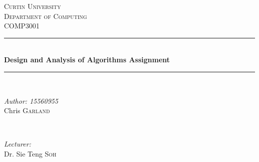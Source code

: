 \begin{titlepage}

\newcommand{\HRule}{\rule{\linewidth}{0.5mm}} 


\center %
 
\textsc{\LARGE Curtin University}\\[1.5cm] %
\textsc{\Large Department of Computing}\\[0.5cm] %
\textsc{\large COMP3001}\\[0.5cm] %


\HRule \\[0.4cm]
{ \huge \bfseries Design and Analysis of Algorithms Assignment}\\[0.4cm] %
\HRule \\[1.5cm]
 

\begin{minipage}{0.4\textwidth}
\begin{flushleft} \large
\emph{Author: 15560955}\\
Chris \textsc{Garland} %
\end{flushleft}
\end{minipage}
~
\begin{minipage}{0.4\textwidth}
\begin{flushright} \large
\emph{Lecturer:} \\
Dr. Sie Teng \textsc{Soh} %
\end{flushright}
\end{minipage}\\[4cm]



\end{titlepage}
